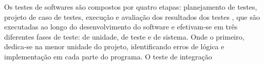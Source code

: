 Os testes de softwares são compostos por quatro etapas: planejamento de testes, projeto de caso de testes, execução e avaliação dos resultados dos testes \cite{Maldonado2004}, que são executadas ao longo do desenvolvimento do software e efetivam-se em três diferentes fases de teste: de unidade, de teste e de sistema. Onde o primeiro, dedica-se na menor unidade do projeto, identificando erros de lógica e implementação em cada parte do programa. O teste de integração 
